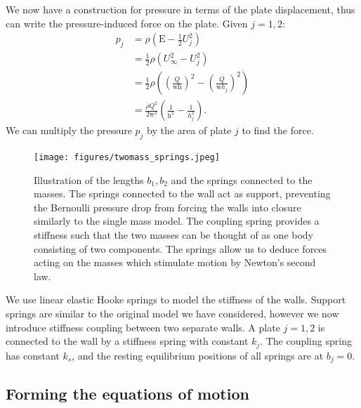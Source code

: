 We now have a construction for pressure in terms of the plate displacement, thus can write the pressure-induced force on the plate.
Given \(j=1,2:\)
\begin{equation}
    \begin{aligned}
        p_j &= \rho\left(\mathrm{E} - \frac{1}{2}U_j^2 \right) \\
        &= \frac{1}{2}\rho\left(U_\infty^2 - U_j^2\right) \\
        &= \frac{1}{2}\rho\left( \left(\frac{Q}{\mathrm{wh}}\right)^2 - \left(\frac{Q}{\mathrm{w}h_j}\right)^2 \right) \\
        &= \frac{\rho Q^2}{2\mathrm{w}^2}\left( \frac{1}{\mathrm{h}^2} - \frac{1}{h_j^2} \right).
    \end{aligned}
    \label{eqn:twomass_pressureterm}
\end{equation}
We can multiply the pressure $p_j$ by the area of plate $j$ to find the force.

\begin{figure}[h!]
    \centering
    \texttt{[image: figures/twomass\_springs.jpeg]}
    \caption
    {
        Illustration of the lengths $b_1,b_2$ and the springs connected to the masses.
        The springs connected to the wall act as support,
        preventing the Bernoulli pressure drop from forcing the walls into closure similarly to the single mass model.
        The coupling spring provides a stiffness such that the two masses can be thought of as one body consisting of two components.
        The springs allow us to deduce forces acting on the masses which stimulate motion by Newton's second law. 
    }
    \label{fig:twomass_springs}
\end{figure}

We use linear elastic Hooke springs to model the stiffness of the walls.
Support springs are similar to the original model we have considered,
however we now introduce stiffness coupling between two separate walls.
A plate $j = 1,2$ is connected to the wall by a stiffness spring with constant ${k}_j$.
The coupling spring has constant $k_s$, and the resting equilibrium positions of all springs are at $b_j = 0$.

\subsection{Forming the equations of motion}

